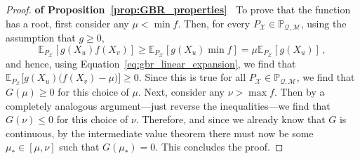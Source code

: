 \documentclass[twoside,11pt]{article}
\newcommand{\states}{\mathcal{X}}
\newcommand{\rateset}{\mathcal{Q}}
\begin{document}
\begin{proof}{\bf of Proposition~\ref{prop:GBR_properties}~}
To prove that the function has a root, first consider any $\mu<\min f$. Then, for every $P_\states\in\mathbb{P}_{\rateset,\mathcal{M}}$, using the assumption that $g\geq 0$,
\begin{equation*}
\mathbb{E}_{P_\states}[g(X_u)f(X_v)] \geq \mathbb{E}_{P_\states}[g(X_u)\min f] = \mu\mathbb{E}_{P_\states}[g(X_u)]\,,
\end{equation*}
and hence, using Equation~\eqref{eq:gbr_linear_expansion}, we find that $\mathbb{E}_{P_\states}\bigl[g(X_u)\bigl(f(X_v)-\mu\bigr)\bigr] \geq 0$. Since this is true for all $P_\states\in \mathbb{P}_{\rateset,\mathcal{M}}$, we find that $G(\mu)\geq 0$ for this choice of $\mu$. Next, consider any $\nu>\max f$. Then by a completely analogous argument---just reverse the inequalities---we find that $G(\nu)\leq 0$ for this choice of $\nu$. Therefore, and since we already know that $G$ is continuous, by the intermediate value theorem there must now be some $\mu_*\in[\mu,\nu]$ such that $G(\mu_*)=0$. This concludes the proof.



\end{proof}
\end{document}
